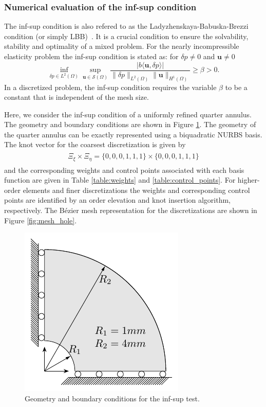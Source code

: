 \subsubsection{{Numerical evaluation of the inf-sup condition}}

The inf-sup condition is also refered to as the Ladyzhenskaya-Babuska-Brezzi condition (or simply LBB)~\cite{babuvska1973finite, brezzi1974existence, ladyzhenskaya1969mathematical}. It is a crucial condition to ensure the solvability, stability and optimality of a mixed problem. For the nearly incompressible elasticity problem the inf-sup condition is stated as: for $\delta{p}\neq{0}$ and $\mathbf{u}\neq{0}$
\begin{equation}
    \inf_{\delta{p}\in{L^2(\Omega)}}\sup_{\mathbf{u}\in\mathcal{S}(\Omega)}\dfrac{\vert{b\langle{\mathbf{u},\delta{p}}\rangle}\vert}{\|{\delta{p}}\|_{L^2(\Omega)}\|{\mathbf{u}}\|_{H^1(\Omega)}}\geq\beta>0.
\end{equation}
In a discretized problem, the inf-sup condition requires the variable $\beta$ to be a constant that is independent of the mesh size.\par

Here, we consider the inf-sup condition of a uniformly refined quarter annulus. The geometry and boundary conditions are shown in Figure \ref{fig:quarter_annulus}. The geometry of the quarter annulus can be exactly represented using a biquadratic NURBS basis. The knot vector for the coarsest discretization is given by
\begin{align}
    \begin{split}
        \Xi_\xi\times\Xi_\eta=\lbrace{0,0,0,1,1,1}\rbrace\times\lbrace{0,0,0,1,1,1}\rbrace
    \end{split}
\end{align}
and the corresponding weights and control points associated with each basis function are given in Table \ref{table:weights} and \ref{table:control_points}. For higher-order elements and finer discretizations the weights and corresponding control points are identified by an order elevation and knot insertion algorithm, respectively. The B\'ezier mesh representation for the discretizations are shown in Figure \ref{fig:mesh_hole}.

\begin{figure}[htb!]
    \centering
    \includegraphics[width=0.5\linewidth]{annular}
    \caption{Geometry and boundary conditions for the inf-sup test.}
    \label{fig:quarter_annulus}
\end{figure}

